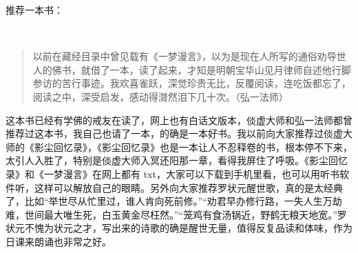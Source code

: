 推荐一本书：

\begin{book}[一梦漫言]~\\
    \begin{quote}
        以前在藏经目录中曾见载有《一梦漫言》，以为是现在人所写的通俗劝导世人的佛书，就借了一本，读了起来，才知是明朝宝华山见月律师自述他行脚参访的苦行事迹。我欢喜雀跃，深觉珍贵无比，反覆阅读，连吃饭都忘了，阅读之中，深受启发，感动得潸然泪下几十次。（弘一法师）
    \end{quote}
    这本书已经有学佛的戒友在读了，网上也有白话文版本，倓虚大师和弘一法师都曾推荐过这本书，我自己也请了一本，的确是一本好书。我以前向大家推荐过倓虚大师的《影尘回忆录》，《影尘回忆录》也是一本让人不忍释卷的书，根本停不下来，太引人入胜了，特别是倓虚大师入冥还阳那一章，看得我屏住了呼吸。《影尘回忆录》和《一梦漫言》在网上都有 txt，大家可以下载到手机里看，也可以用听书软件听，这样可以解放自己的眼睛。另外向大家推荐罗状元醒世歌，真的是太经典了，比如“举世尽从忙里过，谁人肯向死前修。”“劝君早办修行路，一失人生万劫难，世间最大唯生死，白玉黄金尽枉然。”“笼鸡有食汤锅近，野鹤无粮天地宽。”罗状元不愧为状元之才，写出来的诗歌的确是醒世无量，值得反复品读和体味，作为日课来朗诵也非常之好。
\end{book}
